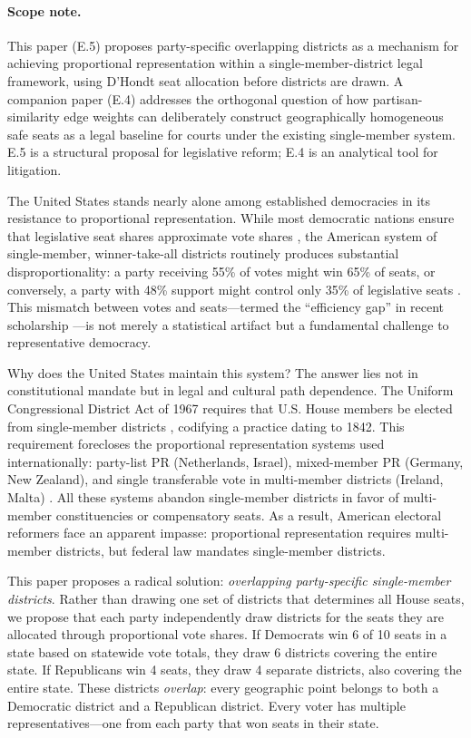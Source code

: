 \paragraph{Scope note.}
This paper (E.5) proposes party-specific overlapping districts as a mechanism for achieving proportional representation within a single-member-district legal framework, using D'Hondt seat allocation before districts are drawn.
A companion paper (E.4) addresses the orthogonal question of how partisan-similarity edge weights can deliberately construct geographically homogeneous safe seats as a legal baseline for courts under the existing single-member system.
E.5 is a structural proposal for legislative reform; E.4 is an analytical tool for litigation.

The United States stands nearly alone among established democracies in its resistance to proportional representation. While most democratic nations ensure that legislative seat shares approximate vote shares \citep{lijphart1999patterns, gallagher2011election}, the American system of single-member, winner-take-all districts routinely produces substantial disproportionality: a party receiving 55\% of votes might win 65\% of seats, or conversely, a party with 48\% support might control only 35\% of legislative seats \citep{stephanopoulos2015partisan}. This mismatch between votes and seats—termed the ``efficiency gap'' in recent scholarship \citep{stephanopoulos2015partisan}—is not merely a statistical artifact but a fundamental challenge to representative democracy.

Why does the United States maintain this system? The answer lies not in constitutional mandate but in legal and cultural path dependence. The Uniform Congressional District Act of 1967 requires that U.S. House members be elected from single-member districts \citep{ucda1967}, codifying a practice dating to 1842. This requirement forecloses the proportional representation systems used internationally: party-list PR (Netherlands, Israel), mixed-member PR (Germany, New Zealand), and single transferable vote in multi-member districts (Ireland, Malta) \citep{farrell2011electoral, massicotte2004mixed}. All these systems abandon single-member districts in favor of multi-member constituencies or compensatory seats. As a result, American electoral reformers face an apparent impasse: proportional representation requires multi-member districts, but federal law mandates single-member districts.

This paper proposes a radical solution: \emph{overlapping party-specific single-member districts}. Rather than drawing one set of districts that determines all House seats, we propose that each party independently draw districts for the seats they are allocated through proportional vote shares. If Democrats win 6 of 10 seats in a state based on statewide vote totals, they draw 6 districts covering the entire state. If Republicans win 4 seats, they draw 4 separate districts, also covering the entire state. These districts \emph{overlap}: every geographic point belongs to both a Democratic district and a Republican district. Every voter has multiple representatives—one from each party that won seats in their state.

